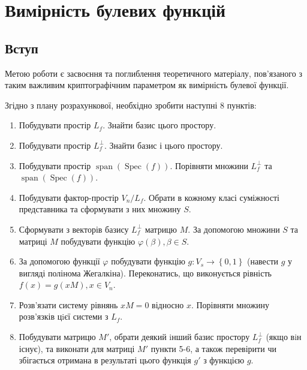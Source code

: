 \chapter{Вимірність булевих функцій}
\label{chap:1}

\section{Вступ}
Метою роботи є засвоєння та поглиблення теоретичного матеріалу, пов’язаного з таким важливим криптографічним
параметром як вимірність булевої функції.

\noindent Згідно з плану розрахункової, необхідно зробити наступні 8 пунктів:
\begin{enumerate}
    \item Побудувати простір $L_{f}$. Знайти базис цього простору.
    \item Побудувати простір $L_{f}^{\perp}$. Знайти базис і цього простору.
    \item Побудувати простір $\operatorname{span}(\operatorname{Spec}(f))$. Порівняти множини $L_{f}^{\perp}$ та
          $\operatorname{span}(\operatorname{Spec}(f))$.
    \item Побудувати фактор-простір $V_{n}/L_{f}$. Обрати в кожному класі суміжності представника та сформувати
          з них множину $S$.
    \item Сформувати з векторів базису $L_{f}^{\perp}$ матрицю $M$. За допомогою множини $S$ та матриці $M$
          побудувати функцію $\varphi(\beta), \beta \in S$.
    \item За допомогою функції $\varphi$ побудувати функцію $g : V_{s} \rightarrow \left\{0, 1\right\}$ (навести
          $g$ у вигляді полінома Жегалкіна). Переконатись, що виконується рівність $f(x) = g(xM), x \in V_{n}$.
    \item Розв’язати систему рівнянь $xM = 0$ відносно $x$. Порівняти множину розв'язків цiєї системи з $L_{f}$.
    \item Побудувати матрицю $M'$, обрати деякий iнший базис простору $L_{f}^{\perp}$ (якщо вiн існує), та виконати
          для матриці $M'$ пункти 5-6, а також перевірити чи збігається отримана в результаті цього функція $g'$ з
          функцією $g$.
\end{enumerate}

